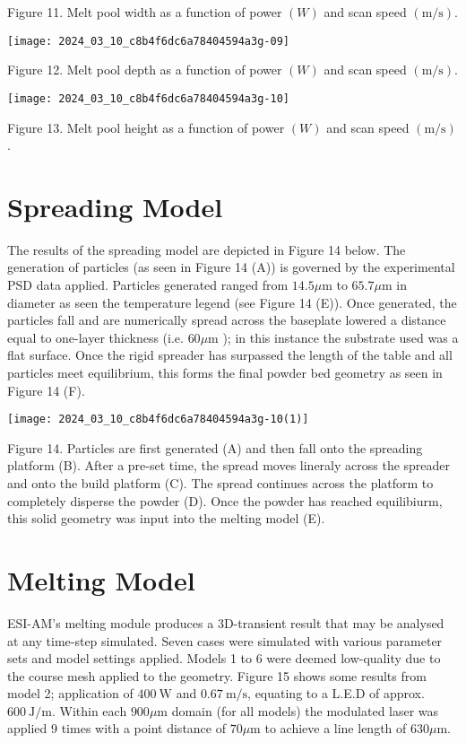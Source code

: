 \documentclass[10pt]{article}
\begin{document}
Figure 11. Melt pool width as a function of power $(W)$ and scan speed $(\mathrm{m} / \mathrm{s})$.

\begin{center}
\texttt{[image: 2024\_03\_10\_c8b4f6dc6a78404594a3g-09]}
\end{center}

Figure 12. Melt pool depth as a function of power $(W)$ and scan speed $(\mathrm{m} / \mathrm{s})$.

\begin{center}
\texttt{[image: 2024\_03\_10\_c8b4f6dc6a78404594a3g-10]}
\end{center}

Figure 13. Melt pool height as a function of power $(W)$ and scan speed $(\mathrm{m} / \mathrm{s})$.

\section*{Spreading Model}
The results of the spreading model are depicted in Figure 14 below. The generation of particles (as seen in Figure 14 (A)) is governed by the experimental PSD data applied. Particles generated ranged from $14.5 \mu \mathrm{m}$ to $65.7 \mu \mathrm{m}$ in diameter as seen the temperature legend (see Figure 14 (E)). Once generated, the particles fall and are numerically spread across the baseplate lowered a distance equal to one-layer thickness (i.e. $60 \mu \mathrm{m}$ ); in this instance the substrate used was a flat surface. Once the rigid spreader has surpassed the length of the table and all particles meet equilibrium, this forms the final powder bed geometry as seen in Figure 14 (F).

\begin{center}
\texttt{[image: 2024\_03\_10\_c8b4f6dc6a78404594a3g-10(1)]}
\end{center}

Figure 14. Particles are first generated (A) and then fall onto the spreading platform (B). After a pre-set time, the spread moves lineraly across the spreader and onto the build platform (C). The spread continues across the platform to completely disperse the powder (D). Once the powder has reached equilibiurm, this solid geometry was input into the melting model (E).

\section*{Melting Model}
ESI-AM's melting module produces a 3D-transient result that may be analysed at any time-step simulated. Seven cases were simulated with various parameter sets and model settings applied. Models 1 to 6 were deemed low-quality due to the course mesh applied to the geometry. Figure 15 shows some results from model 2; application of $400 \mathrm{~W}$ and $0.67 \mathrm{~m} / \mathrm{s}$, equating to a L.E.D of approx. $600 \mathrm{~J} / \mathrm{m}$. Within each $900 \mu \mathrm{m}$ domain (for all models) the modulated laser was applied 9 times with a point distance of $70 \mu \mathrm{m}$ to achieve a line length of $630 \mu \mathrm{m}$.
\end{document}
